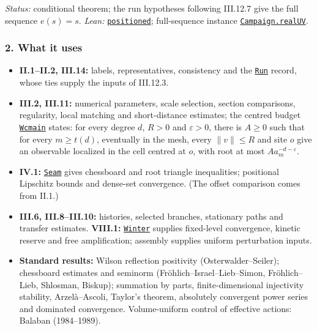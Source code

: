 \documentclass[
  letterpaper,
  11pt]{article}
\providecommand{\tightlist}{%
  \setlength{\itemsep}{0pt}\setlength{\parskip}{0pt}}
\begin{document}
\emph{Status:} conditional theorem; the run hypotheses following
III.12.7 give the full sequence \(e(s)=s\). \emph{Lean:}
\href{https://github.com/yang-mills-group/OpenAI-YM-20261028/blob/3456e5e75cf8d4cd558955a5c7638fba2d68f464/YM/FullVolume/Profiles.lean\#L42-L47}{\texttt{positioned}};
full-sequence instance
\href{https://github.com/yang-mills-group/OpenAI-YM-20261028/blob/3456e5e75cf8d4cd558955a5c7638fba2d68f464/YM/FullVolume/Fields/Filled.lean\#L45}{\texttt{Campaign.realUV}}.

\subsubsection{2. What it uses}\label{what-it-uses-14}

\begin{itemize}
\tightlist
\item
  \textbf{II.1--II.2, III.14:} labels, representatives, consistency and
  the
  \href{https://github.com/yang-mills-group/OpenAI-YM-20261028/blob/3456e5e75cf8d4cd558955a5c7638fba2d68f464/YM/FullVolume/Cross.lean\#L30-L48}{\texttt{Run}}
  record, whose ties supply the inputs of III.12.3.
\item
  \textbf{III.2, III.11:} numerical parameters, scale selection, section
  comparisons, regularity, local matching and short-distance estimates;
  the centred budget
  \href{https://github.com/yang-mills-group/OpenAI-YM-20261028/blob/3456e5e75cf8d4cd558955a5c7638fba2d68f464/YM/Extraction/Center.lean\#L38-L40}{\texttt{Wcmain}}
  states: for every degree \(d\), \(R>0\) and \(\varepsilon>0\), there
  is \(A\ge0\) such that for every \(m\ge t(d)\), eventually in the
  mesh, every \(\|v\|\le R\) and site \(o\) give an observable localized
  in the cell centred at \(o\), with root at most
  \(A a_m^{-d-\varepsilon}\).
\item
  \textbf{IV.1:}
  \href{https://github.com/yang-mills-group/OpenAI-YM-20261028/blob/3456e5e75cf8d4cd558955a5c7638fba2d68f464/YM/Cells/Certificate.lean\#L14-L19}{\texttt{Seam}}
  gives chessboard and root triangle inequalities; positional Lipschitz
  bounds and dense-set convergence. (The offset comparison comes from
  II.1.)
\item
  \textbf{III.6, III.8--III.10:} histories, selected branches,
  stationary paths and transfer estimates. \textbf{VIII.1:}
  \href{https://github.com/yang-mills-group/OpenAI-YM-20261028/blob/3456e5e75cf8d4cd558955a5c7638fba2d68f464/YM/FullVolume/Glide/Vac.lean\#L31-L63}{\texttt{Winter}}
  supplies fixed-level convergence, kinetic reserve and free
  amplification; assembly supplies uniform perturbation inputs.
\item
  \textbf{Standard results:} Wilson reflection positivity
  (Osterwalder--Seiler); chessboard estimates and seminorm
  (Fröhlich--Israel--Lieb--Simon, Fröhlich--Lieb, Shlosman, Biskup);
  summation by parts, finite-dimensional injectivity stability,
  Arzelà--Ascoli, Taylor's theorem, absolutely convergent power series
  and dominated convergence. Volume-uniform control of effective
  actions: Balaban (1984--1989).
\end{itemize}
\end{document}
